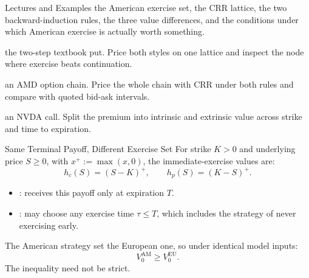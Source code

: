 \documentclass[aspectratio=169,11pt]{beamer}
\newcommand{\AM}{\mathrm{AM}}
\newcommand{\EU}{\mathrm{EU}}
\begin{document}
\begin{frame}{Lectures and Examples}
  \textbf{} the American exercise set, the CRR lattice, the two
  backward-induction rules, the three value differences, and the conditions
  under which American exercise is actually worth something.

  \vspace{0.8em}
  \textbf{} the two-step textbook put. Price both styles on one
  lattice and inspect the node where exercise beats continuation.

  \vspace{0.55em}
  \textbf{} an AMD option chain. Price the whole chain with CRR
  under both rules and compare with quoted bid-ask intervals.

  \vspace{0.55em}
  \textbf{} an NVDA call. Split the premium into intrinsic and
  extrinsic value across strike and time to expiration.
\end{frame}

\begin{frame}{Same Terminal Payoff, Different Exercise Set}
  For strike $K>0$ and underlying price $S\geq0$, with $x^{+}:=\max(x,0)$, the
  immediate-exercise values are:
  \[
    h_c(S)=(S-K)^{+},\qquad h_p(S)=(K-S)^{+}.
  \]
  \begin{itemize}\setlength{\itemsep}{0.4em}
    \item {}: receives this payoff only at expiration $T$.
    \item {}: may choose any exercise time $\tau\leq T$, which
      includes the strategy of never exercising early.
  \end{itemize}
  The American strategy set  the European one, so under
  identical model inputs:
  \[
    \boxed{V_0^{\AM}\geq V_0^{\EU}.}
  \]
  The inequality need not be strict.
\end{frame}
\end{document}
